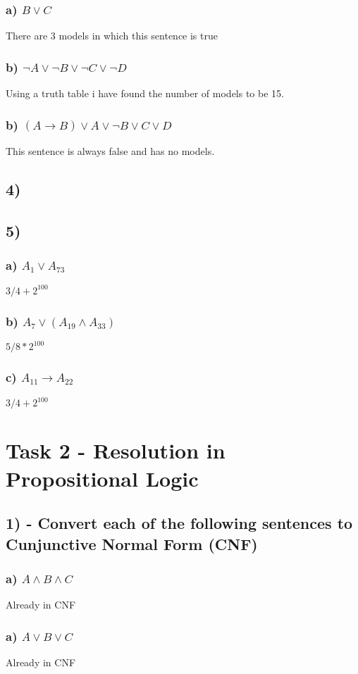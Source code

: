 \documentclass{article}
\begin{document}
	\subsubsection*{a) \(B \lor C\)}
		There are 3 models in which this sentence is true
	\subsubsection*{b) \(\lnot A \lor  \lnot B \lor \lnot C \lor \lnot D\)}
		Using a truth table i have found the number of models to be 15.
	\subsubsection*{b) \((A \to B) \lor A \lor  \lnot B \lor C \lor D\)}
		This sentence is always false and has no models.

\subsection*{4)}
\subsection*{5)}
	\subsubsection*{a) \(A_1 \lor A_{73}\)}
		\(3/4 + 2^{100}\)
	\subsubsection*{b) \(A_7 \lor (A_{19} \wedge A_{33})\)}
		\(5/8 * 2^{100}\)
	\subsubsection*{c) \(A_{11} \to A_{22}\)}
		\(3/4 + 2^{100}\)
\section*{Task 2 - Resolution in Propositional Logic}
\subsection*{1) - Convert each of the following sentences to Cunjunctive Normal Form (CNF)}
	\subsubsection*{a) \(A \wedge B \wedge C\)}
	Already in CNF
	\subsubsection*{a) \(A \lor B \lor C\)}
	Already in CNF
\end{document}

